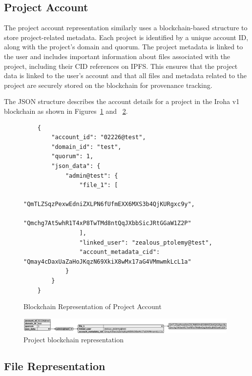 \documentclass[final]{rc-book-2.14}
\begin{document}
\subsection{Project Account}

The project account representation similarly uses a blockchain-based structure to store project-related metadata. Each project is identified by a unique account ID, along with the project’s domain and quorum. The project metadata is linked to the user and includes important information about files associated with the project, including their CID references on IPFS. This ensures that the project data is linked to the user’s account and that all files and metadata related to the project are securely stored on the blockchain for provenance tracking.

The JSON structure describes the account details for a project in the Iroha v1 blockchain as shown in Figures~\ref{fig:project_blockchain_representation} and ~\ref{fig:project_bct_rep}.


\begin{figure}[h]
    \centering
    \caption{Blockchain Representation of Project Account}
    \label{fig:project_blockchain_representation}
    \begin{verbatim}
    {
        "account_id": "02226@test",
        "domain_id": "test",
        "quorum": 1,
        "json_data": {
            "admin@test": {
                "file_1": [
                    "QmTLZSqzPexwEdniZXLPN6fUfmEXX6MXS3b4QjKURgxc9y",
                    "Qmchg7At5whR1T4xP8TwTMd8ntQqJXbbSicJRtGGaW1Z2P"
                ],
                "linked_user": "zealous_ptolemy@test",
                "account_metadata_cid": "Qmay4cDaxUaZaHoJKqzN69XkiX8wMx17aG4VMmwmkLcL1a"
            }
        }
    }
    \end{verbatim}
\end{figure}


\begin{figure}[htbp]
    \centering
    \includegraphics[width=0.98\textwidth, keepaspectratio]{fig/bct_user_representation.eps}
    \caption{Project blockchain representation}
    \label{fig:project_bct_rep}
\end{figure}



\subsection*{File Representation}
\end{document}

